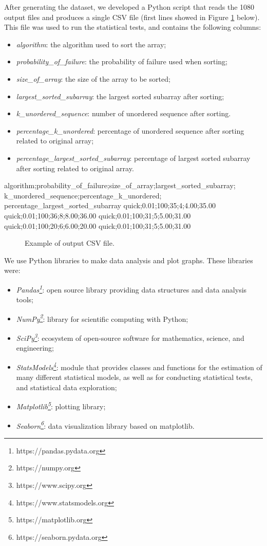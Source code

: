After generating the dataset, we developed a Python script that reads the 1080 output files and produces a single CSV file (first lines showed in Figure \ref{fig-output-csv-file-example} below). This file was used to run the statistical tests, and contains the following columns:
\begin{itemize}
    \item \textit{algorithm}: the algorithm used to sort the array;
    \item \textit{probability\_of\_failure}: the probability of failure used when sorting;
    \item \textit{size\_of\_array}: the size of the array to be sorted;
    \item \textit{largest\_sorted\_subarray}: the largest sorted subarray after sorting;
    \item \textit{k\_unordered\_sequence}: number of unordered sequence after sorting.
    \item \textit{percentage\_k\_unordered}: percentage of unordered sequence after sorting related to original array;
    \item \textit{percentage\_largest\_sorted\_subarray}: percentage of largest sorted subarray after sorting related to original array.
\end{itemize}

\begin{verbbox}[\mbox{}]
algorithm;probability_of_failure;size_of_array;largest_sorted_subarray;
k_unordered_sequence;percentage_k_unordered;
percentage_largest_sorted_subarray
quick;0.01;100;35;4;4.00;35.00
quick;0.01;100;36;8;8.00;36.00
quick;0.01;100;31;5;5.00;31.00
quick;0.01;100;20;6;6.00;20.00
quick;0.01;100;31;5;5.00;31.00
\end{verbbox}
        
\begin{figure}[H]
    \centering
    \fbox{
    \theverbbox
    }
    \caption{Example of output CSV file.}
    \label{fig-output-csv-file-example}
\end{figure}

We use Python libraries to make data analysis and plot graphs. These libraries were:
\begin{itemize}
    \item \textit{Pandas\footnote{https://pandas.pydata.org}}: open source library providing data structures and data analysis tools;
    \item \textit{NumPy\footnote{https://numpy.org}}: library for scientific computing with Python;
    \item \textit{SciPy\footnote{https://www.scipy.org}}: ecosystem of open-source software for mathematics, science, and engineering;
    \item \textit{StatsModels\footnote{https://www.statsmodels.org}}: module that provides classes and functions for the estimation of many different statistical models, as well as for conducting statistical tests, and statistical data exploration;
    \item \textit{Matplotlib\footnote{https://matplotlib.org}}: plotting library;
    \item \textit{Seaborn\footnote{https://seaborn.pydata.org}}: data visualization library based on matplotlib.
\end{itemize}